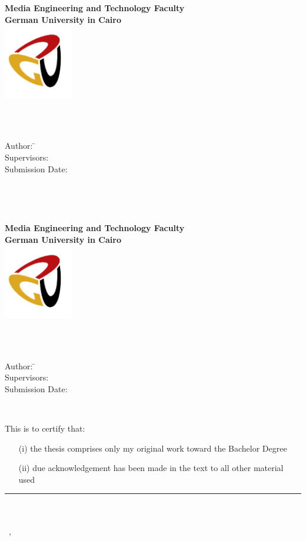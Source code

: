 \newcommand{\titlePage}{
    \thispagestyle{empty}
    \begin{center}
    	\textbf{Media Engineering and Technology Faculty}\\[1mm]
    	\textbf{German University in Cairo}\\[1mm]
    	\includegraphics[width=3cm]{images/title_page/GUC_logo.jpg}
    	
    	\vspace{2cm}
    	\doublespacing
    	{\Huge \textbf{\titleOfThesisOne}}\\
    	\singlespacing
    	\vspace{2cm}
    	{\large \textbf{\typeOfThesis}}\\
    	
    	\vfill
    	\parbox{1cm}{
      		\begin{large}
        			\begin{tabbing}
           			Author: \hspace{2cm}  
            			\=\authorOfThesis\\[2mm]
          			Supervisors: 
            			\>\supervisor\\[2mm]
          			Submission Date: 
            			\>\submissionDate\\
        			\end{tabbing}
      		\end{large}
    	}\\
    \end{center}
    \clearpage
}


\titlePage
\thispagestyle{empty}\ \clearpage
\titlePage


\thispagestyle{empty}
This is to certify that:
\begin{itemize}
\item[(i)] the thesis comprises only my original work toward the Bachelor Degree
\item[(ii)] due acknowledgement has been made in the text to all other material used
\end{itemize}

\vspace{2cm}
\begin{flushright}
\rule[0mm]{6cm}{0.2mm}\\
\authorOfThesis\\
\submissionDay~\submissionMonth,~\submissionYear\\
\end{flushright}
\clearpage
